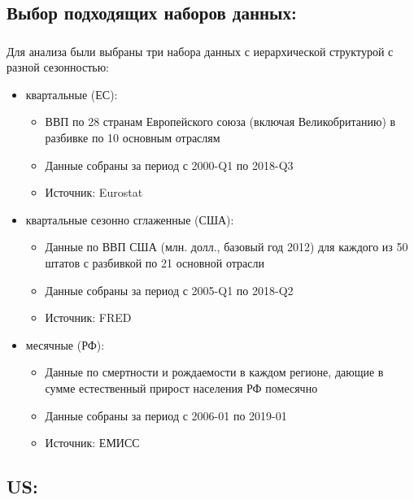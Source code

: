 \documentclass[c, dvipsnames]{beamer}  %
\begin{document}
\subsection{Выбор подходящих наборов данных:} 

\begin{frame}[shrink=5]
\frametitle{\insertsection} 
\framesubtitle{\insertsubsection}


Для анализа были выбраны три набора данных с иерархической структурой с разной сезонностью: 

\begin{itemize}
	\item квартальные (ЕС):
	
	\begin{itemize}
		\item ВВП по 28 странам Европейского союза (включая Великобританию) в разбивке по 10 основным отраслям
		\item Данные собраны за период с 2000-Q1 по 2018-Q3
		\item Источник: Eurostat
	\end{itemize}
	

	\item квартальные сезонно сглаженные (США):
	
	\begin{itemize}
		\item Данные по ВВП США (млн. долл., базовый год 2012) для каждого из 50 штатов с разбивкой по 21 основной отрасли
		\item Данные собраны за период с 2005-Q1 по 2018-Q2
		\item Источник: FRED
	\end{itemize}
		
	\item месячные (РФ):
	
	\begin{itemize}
		\item Данные по смертности и рождаемости в каждом регионе, дающие в сумме естественный прирост населения РФ помесячно
		\item Данные собраны за период с 2006-01 по 2019-01 
		\item Источник: ЕМИСС
	\end{itemize}
		
		
\end{itemize}

\end{frame}



\subsection{US:} 
\end{document}
